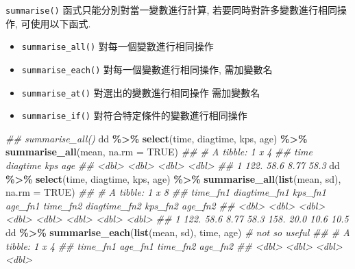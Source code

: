 \documentclass[
]{book}
\newenvironment{Shaded}{\begin{snugshade}}{\end{snugshade}}
\newcommand{\CommentTok}[1]{\textcolor[rgb]{0.56,0.35,0.01}{\textit{#1}}}
\newcommand{\DataTypeTok}[1]{\textcolor[rgb]{0.13,0.29,0.53}{#1}}
\newcommand{\KeywordTok}[1]{\textcolor[rgb]{0.13,0.29,0.53}{\textbf{#1}}}
\newcommand{\NormalTok}[1]{#1}
\newcommand{\OperatorTok}[1]{\textcolor[rgb]{0.81,0.36,0.00}{\textbf{#1}}}
\newcommand{\OtherTok}[1]{\textcolor[rgb]{0.56,0.35,0.01}{#1}}
\newcommand{\StringTok}[1]{\textcolor[rgb]{0.31,0.60,0.02}{#1}}
\providecommand{\tightlist}{%
  \setlength{\itemsep}{0pt}\setlength{\parskip}{0pt}}
\begin{document}
\texttt{summarise()} 函式只能分別對當一變數進行計算,
若要同時對許多變數進行相同操作,
可使用以下函式.

\begin{itemize}
\tightlist
\item
  \texttt{summarise\_all()} 對每一個變數進行相同操作
\item
  \texttt{summarise\_each()} 對每一個變數進行相同操作, 需加變數名
\item
  \texttt{summarise\_at()} 對選出的變數進行相同操作 需加變數名
\item
  \texttt{summarise\_if()} 對符合特定條件的變數進行相同操作
\end{itemize}

\begin{Shaded}
\begin{Highlighting}[]
\CommentTok{\#\# summarise\_all()}
\NormalTok{dd }\OperatorTok{\%\textgreater{}\%}\StringTok{ }
\StringTok{  }\KeywordTok{select}\NormalTok{(time, diagtime, kps, age) }\OperatorTok{\%\textgreater{}\%}\StringTok{ }
\StringTok{  }\KeywordTok{summarise\_all}\NormalTok{(mean, }\DataTypeTok{na.rm =} \OtherTok{TRUE}\NormalTok{)}
\CommentTok{\#\# \# A tibble: 1 x 4}
\CommentTok{\#\#    time diagtime   kps   age}
\CommentTok{\#\#   \textless{}dbl\textgreater{}    \textless{}dbl\textgreater{} \textless{}dbl\textgreater{} \textless{}dbl\textgreater{}}
\CommentTok{\#\# 1  122.     58.6  8.77  58.3}
\NormalTok{dd }\OperatorTok{\%\textgreater{}\%}\StringTok{ }\KeywordTok{select}\NormalTok{(time, diagtime, kps, age) }\OperatorTok{\%\textgreater{}\%}\StringTok{ }
\StringTok{  }\KeywordTok{summarise\_all}\NormalTok{(}\KeywordTok{list}\NormalTok{(mean, sd), }\DataTypeTok{na.rm =} \OtherTok{TRUE}\NormalTok{)}
\CommentTok{\#\# \# A tibble: 1 x 8}
\CommentTok{\#\#   time\_fn1 diagtime\_fn1 kps\_fn1 age\_fn1 time\_fn2 diagtime\_fn2 kps\_fn2 age\_fn2}
\CommentTok{\#\#      \textless{}dbl\textgreater{}        \textless{}dbl\textgreater{}   \textless{}dbl\textgreater{}   \textless{}dbl\textgreater{}    \textless{}dbl\textgreater{}        \textless{}dbl\textgreater{}   \textless{}dbl\textgreater{}   \textless{}dbl\textgreater{}}
\CommentTok{\#\# 1     122.         58.6    8.77    58.3     158.         20.0    10.6    10.5}
\NormalTok{dd }\OperatorTok{\%\textgreater{}\%}
\StringTok{  }\KeywordTok{summarise\_each}\NormalTok{(}\KeywordTok{list}\NormalTok{(mean, sd), time, age) }\CommentTok{\# not so useful}
\CommentTok{\#\# \# A tibble: 1 x 4}
\CommentTok{\#\#   time\_fn1 age\_fn1 time\_fn2 age\_fn2}
\CommentTok{\#\#      \textless{}dbl\textgreater{}   \textless{}dbl\textgreater{}    \textless{}dbl\textgreater{}   \textless{}dbl\textgreater{}}

\end{Highlighting}
\end{Shaded}
\end{document}
